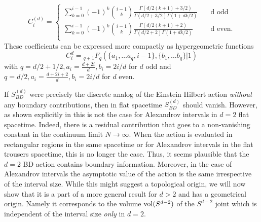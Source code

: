 \documentclass[12pt]{article}
\begin{document}
{\begin{equation}
\label{cid}
 C_i^{(d)}= 
\begin{cases} 
\sum_{k=0}^{i-1} (-1)^k\binom{i-1}{k} \frac{\Gamma(d/2(k+1)+3/2)}{\Gamma(d/2+3/2) \Gamma(1+dk/2)}  \quad  &\mathrm{d \, \, odd}\\ 
\sum_{k=0}^{i-1} (-1)^k\binom{i-1}{k} \frac{\Gamma(d/2(k+1)+2)}{\Gamma(d/2+2) \Gamma(1+dk/2)}  & \mathrm{d \, \,  even.}\\ 
\end{cases} 
\end{equation} 
These coefficients can be expressed more compactly as hypergeometric functions 
\begin{equation}
C_i^d={}_{q+1}F_{q}(\{ a_1, \ldots a_q, i-1\}, \{b_1, \ldots b_q \} |1)
\label{chyp} 
\end{equation} 
with $q=d/2+1/2, a_i=\frac{d+2i}{d}, b_i=2i/d$ for $d$ odd and $q=d/2, a_i=\frac{d+2i+2}{d}, b_i=2i/d$  for $d$ even.  


If $S_{BD}^{(d)}$ were precisely the discrete analog of the Einstein Hilbert action {\it without} any boundary contributions, then in flat spacetime  $S_{BD}^{(d)}$ should  vanish. However, as shown explicitly in \cite{bbdtwo} this is not the case for Alexandrov intervals in $d=2$  flat spacetime. Indeed, there is a residual contribution that goes to a non-vanishing constant in the continuum limit $N\rightarrow \infty$.  When the action is evaluated in rectangular regions in the same spacetime or for Alexandrov intervals in  the flat trousers spacetime, this is no longer the case. Thus, it seems plausible that the $d=2$ BD action contains boundary information. Moreover, in the case of Alexandrov intervals the asymptotic value of the action is the same  irrespective of the interval size. While this might suggest a  topological origin, we will now show that it is a part of a more general  result for $d>2$ and  has a geometrical origin. Namely it corresponds to the volume  $\mathrm{vol}(S^{d-2})$ of the $S^{d-2}$ joint which is independent of the interval size {\it only} in $d=2$.   

}
\end{document}
